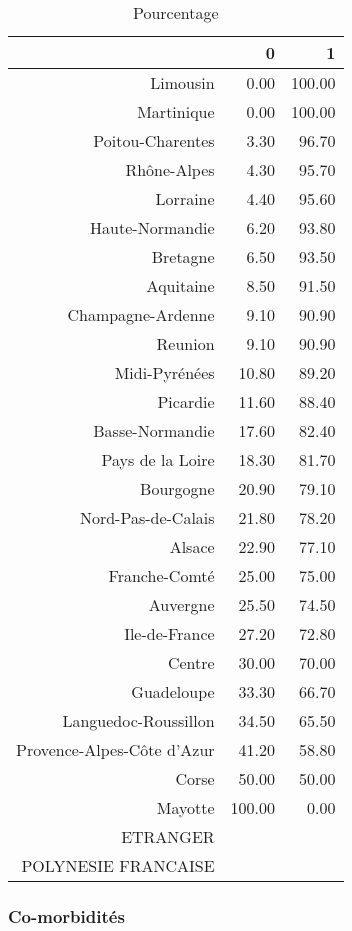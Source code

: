 \documentclass[11pt,a4paper]{article}\usepackage[]{graphicx}\usepackage[]{color}
\begin{document}
\begin{table}[H]
\centering
\begin{tabular}{rrr}
  \hline
 & 0 & 1 \\ 
  \hline
Limousin & 0.00 & 100.00 \\ 
  Martinique & 0.00 & 100.00 \\ 
  Poitou-Charentes & 3.30 & 96.70 \\ 
  Rhône-Alpes & 4.30 & 95.70 \\ 
  Lorraine & 4.40 & 95.60 \\ 
  Haute-Normandie & 6.20 & 93.80 \\ 
  Bretagne & 6.50 & 93.50 \\ 
  Aquitaine & 8.50 & 91.50 \\ 
  Champagne-Ardenne & 9.10 & 90.90 \\ 
  Reunion & 9.10 & 90.90 \\ 
  Midi-Pyrénées & 10.80 & 89.20 \\ 
  Picardie & 11.60 & 88.40 \\ 
  Basse-Normandie & 17.60 & 82.40 \\ 
  Pays de la Loire & 18.30 & 81.70 \\ 
  Bourgogne & 20.90 & 79.10 \\ 
  Nord-Pas-de-Calais & 21.80 & 78.20 \\ 
  Alsace & 22.90 & 77.10 \\ 
  Franche-Comté & 25.00 & 75.00 \\ 
  Auvergne & 25.50 & 74.50 \\ 
  Ile-de-France & 27.20 & 72.80 \\ 
  Centre & 30.00 & 70.00 \\ 
  Guadeloupe & 33.30 & 66.70 \\ 
  Languedoc-Roussillon & 34.50 & 65.50 \\ 
  Provence-Alpes-Côte d'Azur & 41.20 & 58.80 \\ 
  Corse & 50.00 & 50.00 \\ 
  Mayotte & 100.00 & 0.00 \\ 
  ETRANGER &  &  \\ 
  POLYNESIE FRANCAISE &  &  \\ 
   \hline
\end{tabular}
\caption{Pourcentage} 
\end{table}



      \subsubsection{Co-morbidités}
\end{document}
